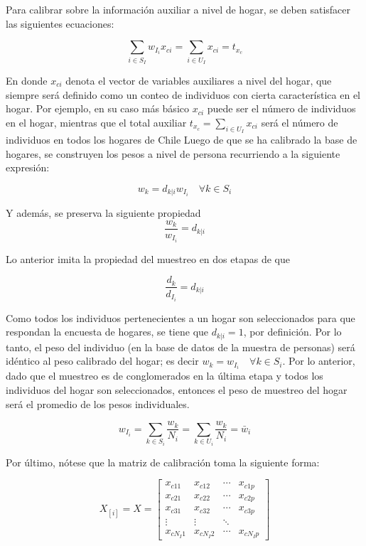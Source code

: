 \documentclass[
  12pt,
  spanish,
]{book}
\begin{document}
Para calibrar sobre la información auxiliar a nivel de hogar, se deben satisfacer las siguientes ecuaciones:

\[
\sum_{i \in S_I}w_{I_i}x_{ci} = \sum_{i \in U_I}x_{ci} = t_{x_c}
\]

En donde \(x_{ci}\) denota el vector de variables auxiliares a nivel del hogar, que siempre será definido como un conteo de individuos con cierta característica en el hogar. Por ejemplo, en su caso más básico \(x_{ci}\) puede ser el número de individuos en el hogar, mientras que el total auxiliar \(t_{x_c} = \sum_{i \in U_I}x_{ci}\) será el número de individuos en todos los hogares de Chile Luego de que se ha calibrado la base de hogares, se construyen los pesos a nivel de persona recurriendo a la siguiente expresión:

\[
w_k = d_{k|i}w_{I_i} \quad \forall k \in S_i
\]

Y además, se preserva la siguiente propiedad
\[
\frac{w_k}{w_{I_i}}=d_{k|i}
\]

Lo anterior imita la propiedad del muestreo en dos etapas de que

\[
\frac{d_k}{d_{I_i}}=d_{k|i}
\]

Como todos los individuos pertenecientes a un hogar son seleccionados para que respondan la encuesta de hogares, se tiene que \(d_{k|i} = 1\), por definición. Por lo tanto, el peso del individuo (en la base de datos de la muestra de personas) será idéntico al peso calibrado del hogar; es decir \(w_k = w_{I_i} \quad \forall k \in S_i\). Por lo anterior, dado que el muestreo es de conglomerados en la última etapa y todos los individuos del hogar son seleccionados, entonces el peso de muestreo del hogar será el promedio de los pesos individuales.

\[
w_{I_i}=\sum_{k\in S_i}\frac{w_k}{N_i}=\sum_{k\in U_i}\frac{w_k}{N_i}=\bar{w}_i
\]

Por último, nótese que la matriz de calibración toma la siguiente forma:

\[
X_{[i]}=X=
\begin{bmatrix}
x_{c11} & x_{c12} & \cdots & x_{c1p}\\
x_{c21} & x_{c22} & \cdots & x_{c2p}\\
x_{c31} & x_{c32} & \cdots & x_{c3p}\\
\vdots  & \vdots & \ddots &\\
x_{cN_I1} & x_{cN_I2} & \cdots & x_{cN_Ip}
\end{bmatrix}
\]
\end{document}
